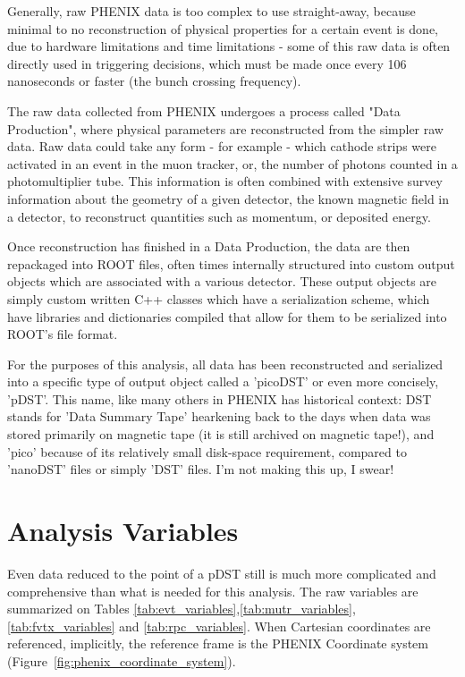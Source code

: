 Generally, raw PHENIX data is too complex to use straight-away, because minimal
to no reconstruction of physical properties for a certain event is done, due to
hardware limitations and time limitations - some of this raw data is often
directly used in triggering decisions, which must be made once every 106
nanoseconds or faster (the bunch crossing frequency).

The raw data collected from PHENIX undergoes a process called "Data Production",
where physical parameters are reconstructed from the simpler raw data. Raw data
could take any form - for example - which cathode strips were activated in an
event in the muon tracker, or, the number of photons counted in a
photomultiplier tube. This information is often combined with extensive survey
information about the geometry of a given detector, the known magnetic field in
a detector, to reconstruct quantities such as momentum, or deposited energy.

Once reconstruction has finished in a Data Production, the data are then
repackaged into ROOT files, often times internally structured into custom output
objects which are associated with a various detector. These output objects are
simply custom written C++ classes which have a serialization scheme, which have
libraries and dictionaries compiled that allow for them to be serialized into
ROOT's file format.

For the purposes of this analysis, all data has been reconstructed and
serialized into a specific type of output object called a 'picoDST' or even more
concisely, 'pDST'. This name, like many others in PHENIX has historical context:
DST stands for 'Data Summary Tape' hearkening back to the days when data was
stored primarily on magnetic tape (it is still archived on magnetic tape!), and
'pico' because of its relatively small disk-space requirement, compared to
'nanoDST' files or simply 'DST' files. I'm not making this up, I swear!

\section{Analysis Variables}

Even data reduced to the point of a pDST still is much more complicated and
comprehensive than what is needed for this analysis. The raw variables are
summarized on Tables \ref{tab:evt_variables},\ref{tab:mutr_variables},
\ref{tab:fvtx_variables} and \ref{tab:rpc_variables}. When Cartesian coordinates
are referenced, implicitly, the reference frame is the PHENIX Coordinate system
(Figure~\ref{fig:phenix_coordinate_system}).

